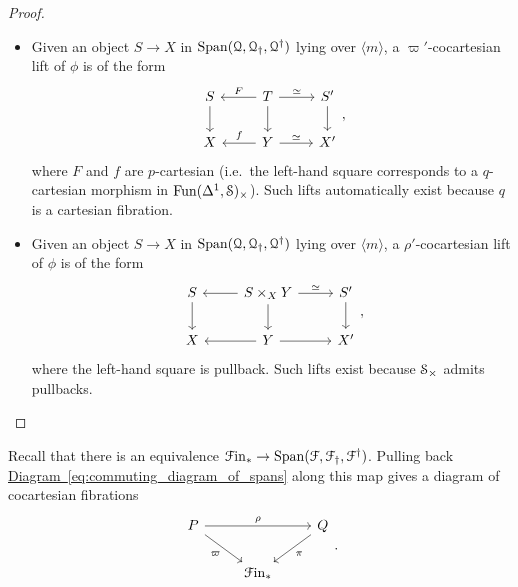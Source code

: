 \documentclass[main.tex]{subfiles}
\begin{document}
\begin{proof}
\begin{itemize}
    \item Given an object $S \to X$ in $\Span\triple{Q}$ lying over $\langle m \rangle$, a $\varpi'$-cocartesian lift of $\phi$ is of the form
      \begin{equation*}
        \begin{tikzcd}
          S
          \arrow[d]
          & T
          \arrow[l, swap, "F"]
          \arrow[r, "\simeq"]
          \arrow[d]
          & S'
          \arrow[d]
          \\
          X
          & Y
          \arrow[l, swap, "f"]
          \arrow[r, "\simeq"]
          & X'
        \end{tikzcd},
      \end{equation*}
      where $F$ and $f$ are $p$-cartesian (i.e.\ the left-hand square corresponds to a $q$-cartesian morphism in $\Fun(\Delta^{1}, \S)_{\times}$). Such lifts automatically exist because $q$ is a cartesian fibration.

    \item Given an object $S \to X$ in $\Span\triple{Q}$ lying over $\langle m \rangle$, a $\rho'$-cocartesian lift of $\phi$ is of the form
      \begin{equation*}
        \begin{tikzcd}
          S
          \arrow[d]
          & S \times_{X} Y
          \arrow[l]
          \arrow[r, "\simeq"]
          \arrow[d]
          & S'
          \arrow[d]
          \\
          X
          & Y
          \arrow[l]
          \arrow[r]
          & X'
        \end{tikzcd},
      \end{equation*}
      where the left-hand square is pullback. Such lifts exist because $\S_{\times}$ admits pullbacks.
  \end{itemize}
\end{proof}

Recall that there is an equivalence $\Finp \to \Span\triple{F}$. Pulling back \hyperref[eq:commuting_diagram_of_spans]{Diagram~\ref*{eq:commuting_diagram_of_spans}} along this map gives a diagram of cocartesian fibrations
\begin{equation*}
  \begin{tikzcd}
    P
    \arrow[rr, "\rho"]
    \arrow[dr, swap, "\varpi"]
    && Q
    \arrow[dl, "\pi"]
    \\
    & \Finp
  \end{tikzcd}.
\end{equation*}
\end{document}
